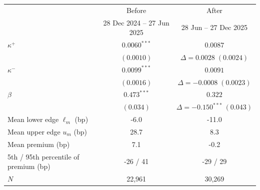 \begin{tabular}{lcc}
\toprule
 & Before & After \\
 & 28 Dec 2024 -- 27 Jun 2025 & 28 Jun -- 27 Dec 2025 \\
\midrule
$\kappa^+$ & $0.0060^{***}$ & $0.0087$ \\
 & $(0.0010)$ & $\Delta = 0.0028\;(0.0024)$ \\
$\kappa^-$ & $0.0099^{***}$ & $0.0091$ \\
 & $(0.0016)$ & $\Delta = -0.0008\;(0.0023)$ \\
$\beta$ & $0.473^{***}$ & $0.322$ \\
 & $(0.034)$ & $\Delta = -0.150^{***}\;(0.043)$ \\
Mean lower edge $\ell_m$ (bp) & -6.0 & -11.0 \\
Mean upper edge $u_m$ (bp) & 28.7 & 8.3 \\
Mean premium (bp) & 7.1 & -0.2 \\
5th / 95th percentile of premium (bp) & -26 / 41 & -29 / 29 \\
$N$ & 22,961 & 30,269 \\
\bottomrule
\end{tabular}

